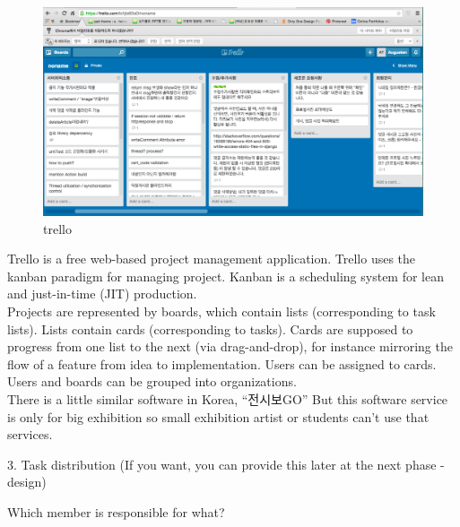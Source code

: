 \documentclass[conference]{IEEEtran}
\begin{document}
\begin{figure}[htbp]
\begin{center}
    \includegraphics[scale=0.2]{img_trello}
    \caption{trello} 
\end{center}
\end{figure}

Trello is a free web-based project management application. Trello uses the kanban paradigm for managing project. 
Kanban is a scheduling system for lean and just-in-time (JIT) production. \\

Projects are represented by boards, which contain lists (corresponding to task lists). Lists contain cards (corresponding to tasks). Cards are supposed to progress from one list to the next (via drag-and-drop), for instance mirroring the flow of a feature from idea to implementation. Users can be assigned to cards. Users and boards can be grouped into organizations.\\
 




There is a little similar software in Korea, “전시보GO” But this software service is only for big exhibition so small exhibition artist or students can’t use that services. 


3. Task distribution (If you want, you can provide this later at the next phase - design) 

Which member is responsible for what? \\\\\\\\\\\\\\\\\\\\\\\\\\\\
\end{document}
